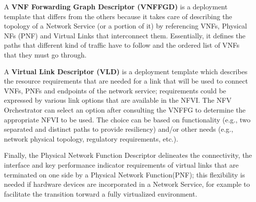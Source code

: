 A \textbf{VNF Forwarding Graph Descriptor (VNFFGD)} is a deployment template that differs from the others because it takes care of describing the topology of a Network Service (or a portion of it) by referencing  VNFs, Physical NFs (PNF) and Virtual Links that interconnect them. Essentially, it defines the paths that different kind of traffic have to follow and the ordered list of VNFs that they must go through.

A \textbf{Virtual Link Descriptor (VLD)} is a deployment template which describes the resource requirements that are needed for a link that will be used to connect VNFs, PNFs and endpoints of the network service; requirements could be expressed by various link options that are available in the NFVI. The NFV Orchestrator can select an option after consulting the VNFFG to determine the appropriate NFVI to be used. The choice can be based on functionality (e.g., two separated and distinct paths to provide resiliency) and/or other needs (e.g., network physical topology, regulatory requirements, etc.).

Finally, the Physical Network Function Descriptor delineates the connectivity, the interface and key performance indicator\cite{KPI} requirements of virtual links that are terminated on one side by a Physical Network Function(PNF); this flexibility is needed if hardware devices are incorporated in a Network Service, for example to facilitate the transition torward a fully virtualized environment.
